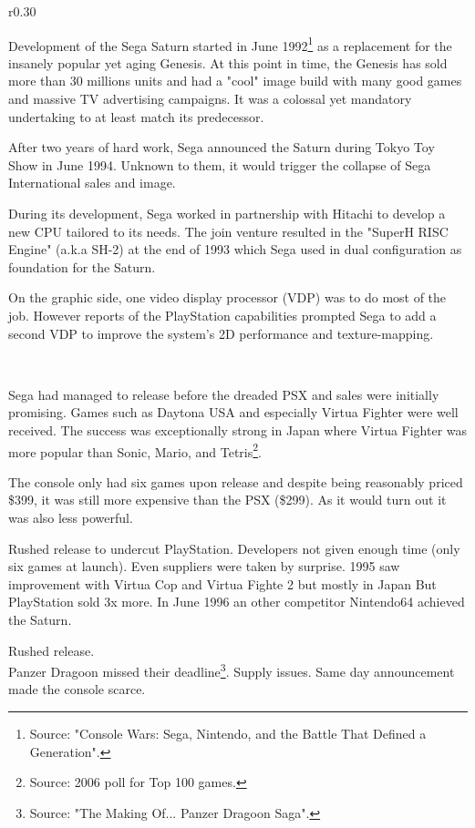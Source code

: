 \begin{wrapfigure}[10]{r}{0.30\textwidth}{
\centering {}}
\end{wrapfigure}
Development of the Sega Saturn started in June 1992\footnote{Source: "Console Wars: Sega, Nintendo, and the Battle That Defined a Generation".} as a replacement for the insanely popular yet aging Genesis. At this point in time, the Genesis has sold more than 30 millions units and had a "cool" image build with many good games and massive TV advertising campaigns. It was a colossal yet mandatory undertaking to at least match its predecessor.\\
\par
After two years of hard work, Sega announced the Saturn during Tokyo Toy Show in June 1994. Unknown to them, it would trigger the collapse of Sega International sales and image.\\
\par
During its development, Sega worked in partnership with Hitachi to develop a new CPU tailored to its needs. The join venture resulted in the "SuperH RISC Engine" (a.k.a SH-2) at the end of 1993 which Sega used in dual configuration as foundation for the Saturn.\\
\par
 On the graphic side, one video display processor (VDP) was to do most of the job. However reports of the PlayStation capabilities prompted Sega to add a second VDP to improve the system's 2D performance and texture-mapping.\\
\par
{}\\

\par
Sega had managed to release before the dreaded PSX and sales were initially promising. Games such as Daytona USA and especially Virtua Fighter were well received. The success was exceptionally strong in Japan where Virtua Fighter was more popular than Sonic, Mario, and Tetris\footnote{Source: 2006 poll for Top 100 games.}.\\
\par
The console only had six games upon release and despite being reasonably priced \$399, it was still more expensive than the PSX (\$299). As it would turn out it was also less powerful.\\
\par
Rushed release to undercut PlayStation. Developers not given enough time (only six games at launch). Even suppliers were taken by surprise. 1995 saw improvement with Virtua Cop and Virtua Fighte 2 but mostly in Japan  But PlayStation sold 3x more. In June 1996 an other competitor Nintendo64 achieved the Saturn.
\par
Rushed release.\\
Panzer Dragoon missed their deadline\footnote{Source: "The Making Of... Panzer Dragoon Saga".}.
Supply issues. Same day announcement made the console scarce.



